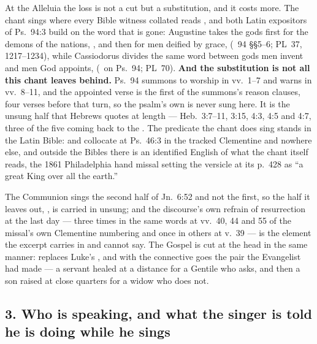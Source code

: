 At the Alleluia the loss is not a cut but a substitution, and it costs more.
The chant sings  where every Bible witness collated
reads , and both Latin expositors of Ps.\ 94:3 build
on the word that is gone: Augustine takes the gods first for the demons of the
nations, , and then for men deified by grace,
 (~94 §§5--6;
PL~37, 1217--1234), while Cassiodorus divides the same word between gods men
invent and men God appoints, 
(\ on Ps.~94; PL~70). \textbf{And the substitution is not all
this chant leaves behind.} Ps.~94 summons to worship in vv.~1--7 and warns in
vv.~8--11, and the appointed verse is the first of the summons's reason
clauses, four verses before that turn, so the psalm's own  is never sung here. It is the unsung half that Hebrews
quotes at length --- Heb.\ 3:7--11, 3:15, 4:3, 4:5 and 4:7, three of the five
coming back to the . The
predicate the chant does sing stands in the Latin Bible:  and
 collocate at Ps.\ 46:3 in the tracked Clementine
and nowhere else, and outside the Bibles there is an identified English of
what the chant itself reads, the 1861 Philadelphia hand missal setting the
versicle at its p.~428 as ``a great King over all the earth.''

The Communion sings the second half of Jn.\ 6:52 and not the first, so the
half it leaves out, , is carried in unsung; and the discourse's own refrain of
resurrection at the last day --- three times in the same words at vv.~40, 44
and 55 of the missal's own Clementine numbering and once in others at v.~39
--- is the element the excerpt carries in and cannot say. The Gospel is cut at
the head in the same manner:  replaces
Luke's , and with the connective goes the
pair the Evangelist had made --- a servant healed at a distance for a Gentile
who asks, and then a son raised at close quarters for a widow who does not.

\subsection*{3. Who is speaking, and what the singer is told he is doing while he sings}


